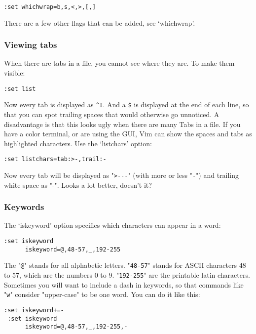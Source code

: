 \begin{Verbatim}[samepage=true]
 :set whichwrap=b,s,<,>,[,]
 \end{Verbatim}

There are a few other flags that can be added, see `whichwrap'.

\subsubsection{Viewing tabs}
When there are tabs in a file, you cannot see where they are.
To make them visible:

 \begin{Verbatim}[samepage=true]
 :set list
 \end{Verbatim}

Now every tab is displayed as \verb!^I!.
And a \verb!$! is displayed at the end of each line, so that you can spot trailing spaces that would otherwise go unnoticed.
A disadvantage is that this looks ugly when there are many Tabs in a file.
If you have a color terminal, or are using the GUI, Vim can show the spaces and tabs as highlighted characters.
Use the `listchars' option:

 \begin{Verbatim}[samepage=true]
 :set listchars=tab:>-,trail:-
 \end{Verbatim}

Now every tab will be displayed as "\verb!>---!" (with more or less "\verb!-!") and trailing white space as "-".
Looks a lot better, doesn't it?

\subsubsection{Keywords}
The `iskeyword' option specifies which characters can appear in a word:

\begin{Verbatim}[samepage=true]
 :set iskeyword
      iskeyword=@,48-57,_,192-255 
\end{Verbatim}

The "\verb!@!" stands for all alphabetic letters.
"\verb!48-57!" stands for ASCII characters 48 to 57, which are the numbers 0 to 9.
"\verb!192-255!" are the printable latin characters.
Sometimes you will want to include a dash in keywords, so that commands like "\verb!w!" consider "upper-case" to be one word.
You can do it like this:

\begin{Verbatim}[samepage=true]
 :set iskeyword+=-
 :set iskeyword
      iskeyword=@,48-57,_,192-255,- 
\end{Verbatim}

